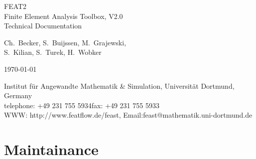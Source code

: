 \documentclass[10pt,a4paper]{report}
\begin{document}
\begin{titlepage}

\vspace*{4cm}

\begin{center}

{\Huge FEAT2}\\[2cm] 
{\huge Finite Element Analysis Toolbox, V2.0}\\[0.5cm] 

{\LARGE Technical Documentation}\\[3cm]

\vspace*{0.5cm}

{\large
 Ch.~Becker, S.~Buijssen, M.~Grajewski,\\[1em]
 S.~Kilian, S.~Turek, H.~Wobker}

\vspace*{2cm}

\today

\vspace*{2cm}

Institut f{\"u}r Angewandte Mathematik \& Simulation, Universit{\"a}t Dortmund, Germany \\[0.5em]
telephone: +49 231 755 5934\qquad fax: +49 231 755 5933 \\[0.5em]
WWW: http://www.featflow.de/feast, Email:feast@mathematik.uni-dortmund.de

\end{center}

\end{titlepage}


\tableofcontents


\chapter{Maintainance}





%


%

%


%

\nocite{Turek1997c,Turek1998}

\end{document}
